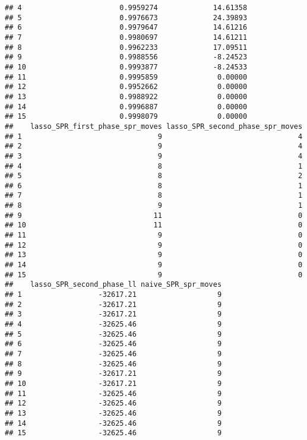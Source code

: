 \documentclass[
]{article}
\begin{document}
\begin{verbatim}
## 4                       0.9959274             14.61358
## 5                       0.9976673             24.39893
## 6                       0.9979647             14.61216
## 7                       0.9980697             14.61211
## 8                       0.9962233             17.09511
## 9                       0.9988556             -8.24523
## 10                      0.9993877             -8.24533
## 11                      0.9995859              0.00000
## 12                      0.9952662              0.00000
## 13                      0.9988922              0.00000
## 14                      0.9996887              0.00000
## 15                      0.9998079              0.00000
##    lasso_SPR_first_phase_spr_moves lasso_SPR_second_phase_spr_moves
## 1                                9                                4
## 2                                9                                4
## 3                                9                                4
## 4                                8                                1
## 5                                8                                2
## 6                                8                                1
## 7                                8                                1
## 8                                9                                1
## 9                               11                                0
## 10                              11                                0
## 11                               9                                0
## 12                               9                                0
## 13                               9                                0
## 14                               9                                0
## 15                               9                                0
##    lasso_SPR_second_phase_ll naive_SPR_spr_moves
## 1                  -32617.21                   9
## 2                  -32617.21                   9
## 3                  -32617.21                   9
## 4                  -32625.46                   9
## 5                  -32625.46                   9
## 6                  -32625.46                   9
## 7                  -32625.46                   9
## 8                  -32625.46                   9
## 9                  -32617.21                   9
## 10                 -32617.21                   9
## 11                 -32625.46                   9
## 12                 -32625.46                   9
## 13                 -32625.46                   9
## 14                 -32625.46                   9
## 15                 -32625.46                   9
\end{verbatim}
\end{document}
